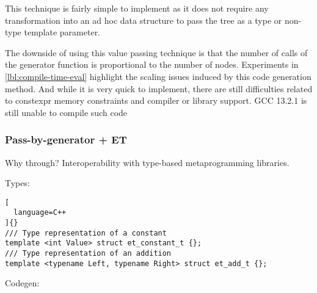 \documentclass[../main]{subfiles}
\begin{document}
This technique is fairly simple to implement as it does not require any
transformation into an ad hoc data structure to pass the tree as a type
or non-type template parameter.

The downside of using this value passing technique is that the
number of calls of the generator function is proportional to the
number of nodes. Experiments in \ref{lbl:compile-time-eval} highlight
the scaling issues induced by this code generation method.
And while it is very quick to implement, there are still difficulties
related to \gls{constexpr} memory constraints and compiler or library support.
GCC 13.2.1 is still unable to compile such code


\subsubsection{
  Pass-by-generator + ET
}

\label{lbl:pbg-et-technique}

Why through? Interoperability with type-based metaprogramming libraries.

Types:

\begin{lstlisting}[
  language=C++
]{}
/// Type representation of a constant
template <int Value> struct et_constant_t {};
/// Type representation of an addition
template <typename Left, typename Right> struct et_add_t {};
\end{lstlisting}

Codegen:
\end{document}
